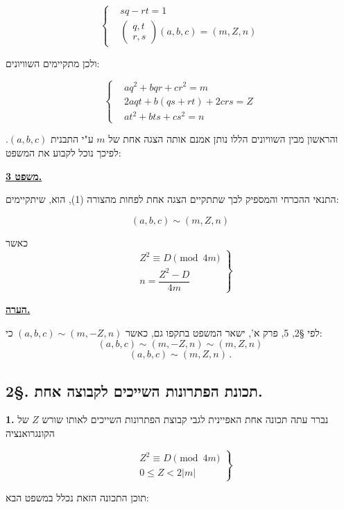 \[ \left\{ \begin{aligned} & sq - rt = 1 \\ & \begin{pmatrix} q , t \\ r , s \end{pmatrix} (a,b,c) = (m,Z,n) \end{aligned} \right. \tag{13} \]

\noindent ולכן מתקיימים השוויונים:

\[ \left\{ \begin{aligned} & aq^2 + bqr + cr^2 = m \\ & 2aqt + b(qs+rt) + 2crs = Z \\ & at^2 + bts + cs^2 = n \end{aligned} \right. \tag{14} \]

\noindent והראשון מבין השוויונים הללו נותן אמנם אותה הצגה אחת של $m$ ע"י התבנית $(a,b,c)$. לפיכך נוכל לקבוע את המשפט:

\bigskip
\noindent\textbf{\underline{משפט 3.}}

\noindent התנאי ההכרחי והמספיק לכך שתתקיים הצגה אחת לפחות מהצורה (1), הוא, שיתקיימים:

\[ (a,b,c) \sim (m,Z,n) \]

\noindent כאשר
\[ \left. \begin{aligned} & Z^2 \equiv D \pmod{4m} \\ & n = \dfrac{Z^2-D}{4m} \end{aligned} \right\} \]

\bigskip
\noindent\textbf{\underline{הערה.}}

\noindent לפי \S2, 5, פרק א', ישאר המשפט בתקפו גם, כאשר $(a,b,c) \sim (m,-Z,n)$ כי:
\[ (a,b,c) \sim (m,-Z,n) \sim (m,Z,n) \]
\[ (a,b,c) \sim (m,Z,n) \, . \]

\subsection*{2\S. תכונת הפתרונות השייכים לקבוצה אחת.}

\noindent\textbf{1.} נברר עתה תכונה אחת האפיינית לגבי קבוצת הפתרונות השייכים לאותו שורש $Z$ של הקונגרואנציה

\[ \left. \begin{aligned} & Z^2 \equiv D \pmod{4m} \\ & 0 \leq Z < 2|m| \end{aligned} \right\} \tag{1} \]

\noindent תוכן התכונה הזאת נכלל במשפט הבא:

